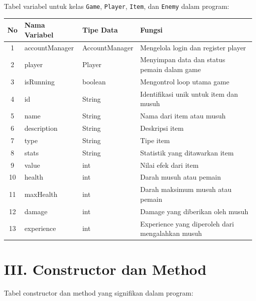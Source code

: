 \documentclass{article}
\begin{document}
Tabel variabel untuk kelas \texttt{Game}, \texttt{Player}, \texttt{Item}, dan \texttt{Enemy} dalam program:

\begin{tabular}{|c|l|l|p{7cm}|}
\hline
No & Nama Variabel & Tipe Data & Fungsi \\
\hline
1 & accountManager & AccountManager & Mengelola login dan register player \\
2 & player & Player & Menyimpan data dan status pemain dalam game \\
3 & isRunning & boolean & Mengontrol loop utama game \\
4 & id & String & Identifikasi unik untuk item dan musuh \\
5 & name & String & Nama dari item atau musuh \\
6 & description & String & Deskripsi item \\
7 & type & String & Tipe item \\
8 & stats & String & Statistik yang ditawarkan item \\
9 & value & int & Nilai efek dari item \\
10 & health & int & Darah musuh atau pemain \\
11 & maxHealth & int & Darah maksimum musuh atau pemain \\
12 & damage & int & Damage yang diberikan oleh musuh \\
13 & experience & int & Experience yang diperoleh dari mengalahkan musuh \\
\hline
\end{tabular}

\section*{III. Constructor dan Method}

Tabel constructor dan method yang signifikan dalam program:
\end{document}
